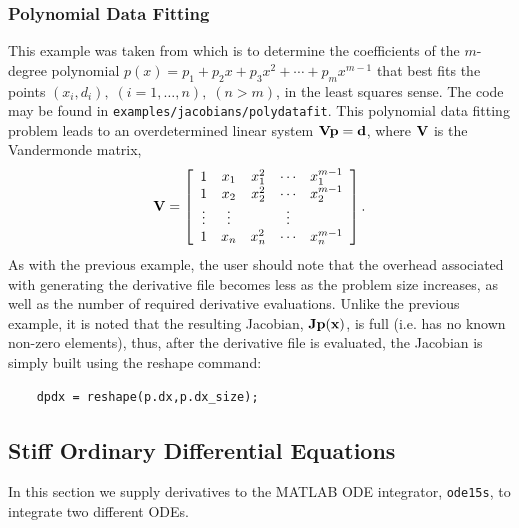 \documentclass[10pt,pdftex]{article}
\begin{document}
\subsubsection{Polynomial Data Fitting}
This example was taken from \cite{Bischof2002CST} which  is to determine the coefficients of the $m$-degree
polynomial $p(x) = p_1 + p_2 x + p_3 x^2 + \cdots + p_m x^{m-1}$ that
best fits the points $(x_i,d_i),\;(i = 1,\dots,n),\; (n > m)$, in the least
squares sense. The code may be found in \texttt{examples/jacobians/polydatafit}. This polynomial data fitting problem leads to an 
overdetermined linear system $\mathbf{V} \mathbf{p} = \mathbf{d}$, where $\mathbf{V}$ is the
Vandermonde matrix,  
\begin{equation}
\mathbf{V} = \left[ \begin{array}{c c c c c}
1 & x_1 & x_1^2 & \cdots & x_1^{m-1} \\
1 & x_2 & x_2^2 & \cdots & x_2^{m-1} \\
\vdots & \vdots &  & \vdots \\
1 & x_n & x_n^2 & \cdots & x_n^{m-1}\\
\end{array}\right].
\end{equation}
As with the previous example, the user should note that the overhead associated with generating the derivative file becomes less as the problem size increases, as well as the number of required derivative evaluations. Unlike the previous example, it is noted that the resulting Jacobian, $\mathbf{J}\mathbf{p}(\mathbf{x})$, is full (i.e. has no known non-zero elements), thus, after the derivative file is evaluated, the Jacobian is simply built using the reshape command:
\begin{verbatim}
    dpdx = reshape(p.dx,p.dx_size);
\end{verbatim}

\subsection{Stiff Ordinary Differential Equations}
In this section we supply derivatives to the MATLAB ODE integrator, \texttt{ode15s}, to integrate two different ODEs.
\end{document}

